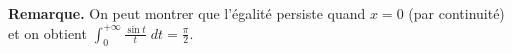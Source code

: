 {{\begin{center}
\end{center}

\textbf{Remarque.} On peut montrer que l'égalité persiste quand $x=0$ (par continuité) et on obtient $\int_{0}^{+\infty} \frac{\sin t}{t}\;dt= \frac{\pi}{2}$.}
}